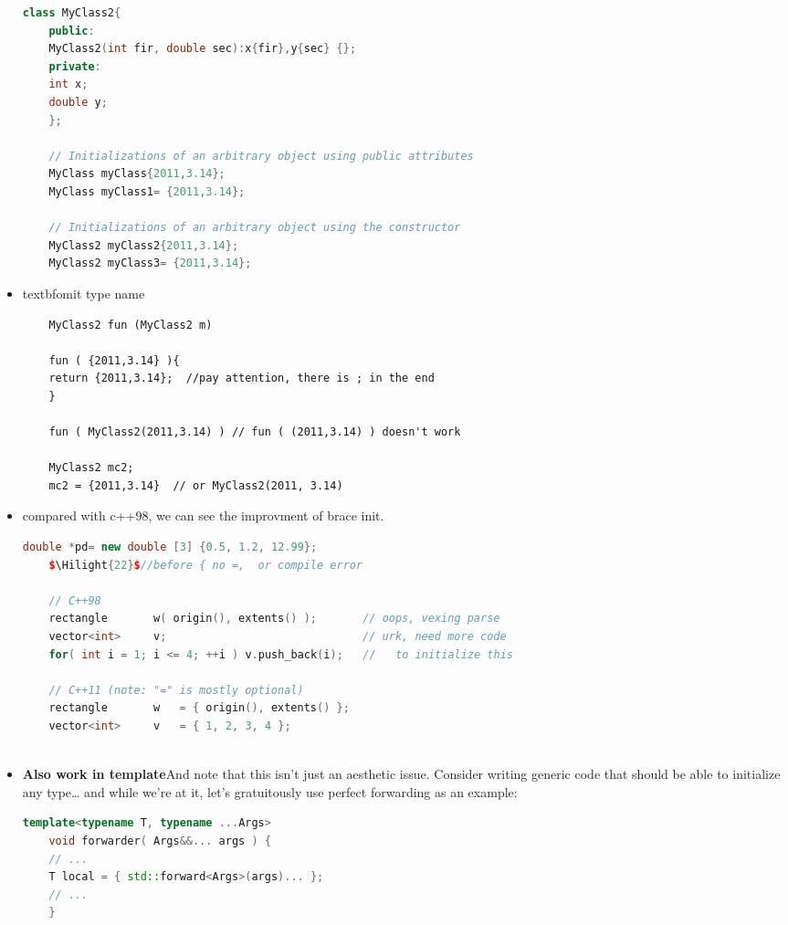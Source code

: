 \documentclass[a4paper,12pt,twoside]{book}
\newcommand{\Hilight}[1]{\makebox[0pt][l]{\color{yellow}\rule[-3pt]{#1em}{11pt}}}
\begin{document}
\begin{itemize}
\begin{lstlisting}[frame=single, language=c++,mathescape=true]
	class MyClass2{		
	public:
	MyClass2(int fir, double sec):x{fir},y{sec} {};
	private: 
	int x;
	double y;
	};
	
	// Initializations of an arbitrary object using public attributes	
	MyClass myClass{2011,3.14};      
	MyClass myClass1= {2011,3.14};    
	
	// Initializations of an arbitrary object using the constructor
	MyClass2 myClass2{2011,3.14};     
	MyClass2 myClass3= {2011,3.14};   
	\end{lstlisting}
	
	\item textbf{omit type name}
	
	\begin{lstlisting}
	MyClass2 fun (MyClass2 m) 
	
	fun ( {2011,3.14} ){
	return {2011,3.14};  //pay attention, there is ; in the end
	}
	
	fun ( MyClass2(2011,3.14) ) // fun ( (2011,3.14) ) doesn't work
	
	MyClass2 mc2;
	mc2 = {2011,3.14}  // or MyClass2(2011, 3.14)
	\end{lstlisting}
	
	\item compared with c++98, we can see the improvment of brace init.
	\begin{lstlisting}[frame=single, language=c++,mathescape=true]
	double *pd= new double [3] {0.5, 1.2, 12.99}; 
	$\Hilight{22}$//before { no =,  or compile error
	
	// C++98 
	rectangle       w( origin(), extents() );       // oops, vexing parse 
	vector<int>     v;                              // urk, need more code
	for( int i = 1; i <= 4; ++i ) v.push_back(i);   //   to initialize this
	
	// C++11 (note: "=" is mostly optional)
	rectangle       w   = { origin(), extents() }; 
	vector<int>     v   = { 1, 2, 3, 4 };
	
	\end{lstlisting}
	
	\item \textbf{Also work in template}And note that this isn’t just an aesthetic issue. Consider writing generic code that should be able to initialize any type… and while we’re at it, let’s gratuitously use perfect forwarding as an example:
	
	\begin{lstlisting}[frame=single, language=c++,mathescape=true]
	template<typename T, typename ...Args>
	void forwarder( Args&&... args ) {
	// ...
	T local = { std::forward<Args>(args)... };
	// ...
	}
	

\end{lstlisting}
\end{itemize}
\end{document}
